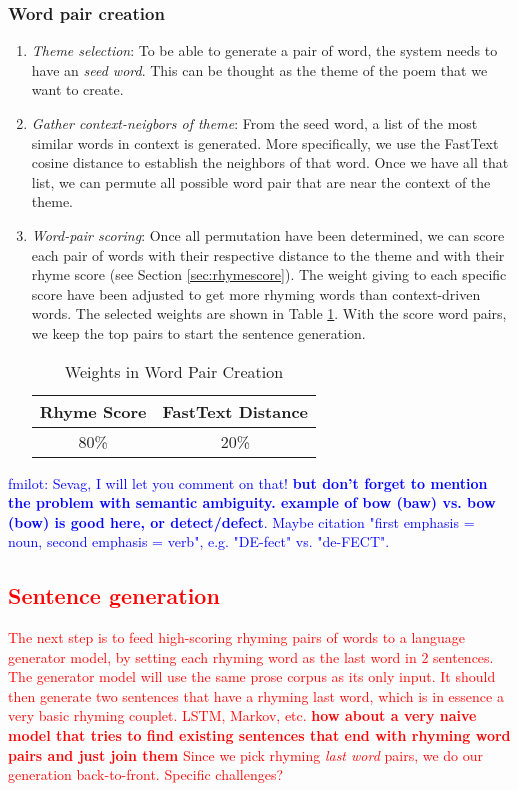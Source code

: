 \documentclass[11pt,a4paper]{article}
\begin{document}
\subsubsection{Word pair creation}
\begin{enumerate}
	\item \textit{Theme selection}: To be able to generate a pair of word, the system needs to have an \textit{seed word}. This can be thought as the theme of the poem that we want to create.
	\item \textit{Gather context-neigbors of theme}: From the seed word, a list of the most similar words in context is generated. More specifically, we use the FastText cosine distance to establish the neighbors of that word. Once we have all that list, we can permute all possible word pair that are near the context of the theme.
	\item \textit{Word-pair scoring}: Once all permutation have been determined, we can score each pair of words with their respective distance to the theme and with their rhyme score (see Section \ref{sec:rhymescore}). The weight giving to each specific score have been adjusted to get more rhyming words than context-driven words. The selected weights are shown in Table \ref{table:weight_wordpair}. With the score word pairs, we keep the top pairs to start the sentence generation.
\begin{table}[ht]
\centering
\begin{tabular}{c c}
	\hline\hline
	Rhyme Score & FastText Distance\\ [0.5ex]
	\hline
	80\% & 20\% \\ [0.5ex]
	\hline
\end{tabular}
\caption{Weights in Word Pair Creation}
\label{table:weight_wordpair}
\end{table}
\end{enumerate}


\textcolor{blue}{
fmilot: Sevag, I will let you comment on that!
\textbf{but don't forget to mention the problem with semantic ambiguity. example of bow (baw) vs. bow (bow) is good here, or detect/defect}. Maybe citation "first emphasis = noun, second emphasis = verb", e.g. "DE-fect" vs. "de-FECT".
}

\textcolor{red}{
\subsection{Sentence generation}
\label{sec:languagegen}
The next step is to feed high-scoring rhyming pairs of words to a language generator model, by setting each rhyming word as the last word in 2 sentences. The generator model will use the same prose corpus as its only input. It should then generate two sentences that have a rhyming last word, which is in essence a very basic rhyming couplet.
LSTM, Markov, etc.
\textbf{how about a very naive model that tries to find existing sentences that end with rhyming word pairs and just join them}
Since we pick rhyming \textit{last word} pairs, we do our generation back-to-front. Specific challenges?
}
\end{document}
